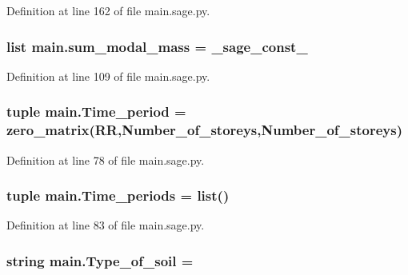 Definition at line 162 of file main.\+sage.\+py.

\hypertarget{namespacemain_a27fb93072b84fd448623807df350f132}{}
\subsubsection[{sum\+\_\+modal\+\_\+mass}]{\setlength{\rightskip}{0pt plus 5cm}list main.\+sum\+\_\+modal\+\_\+mass = \+\_\+sage\+\_\+const\+\_}\label{namespacemain_a27fb93072b84fd448623807df350f132}


Definition at line 109 of file main.\+sage.\+py.

\hypertarget{namespacemain_a76fa8360c88818d30b9b5d2a473e79e4}{}
\subsubsection[{Time\+\_\+period}]{\setlength{\rightskip}{0pt plus 5cm}tuple main.\+Time\+\_\+period = zero\+\_\+matrix(R\+R,Number\+\_\+of\+\_\+storeys,Number\+\_\+of\+\_\+storeys)}\label{namespacemain_a76fa8360c88818d30b9b5d2a473e79e4}


Definition at line 78 of file main.\+sage.\+py.

\hypertarget{namespacemain_afe9c3a972582e300106b7dec57600887}{}
\subsubsection[{Time\+\_\+periods}]{\setlength{\rightskip}{0pt plus 5cm}tuple main.\+Time\+\_\+periods = list()}\label{namespacemain_afe9c3a972582e300106b7dec57600887}


Definition at line 83 of file main.\+sage.\+py.

\hypertarget{namespacemain_a52e65712caa18dade1326ad4efeebfa1}{}
\subsubsection[{Type\+\_\+of\+\_\+soil}]{\setlength{\rightskip}{0pt plus 5cm}string main.\+Type\+\_\+of\+\_\+soil = \textquotesingle{}\textquotesingle{}}\label{namespacemain_a52e65712caa18dade1326ad4efeebfa1}


